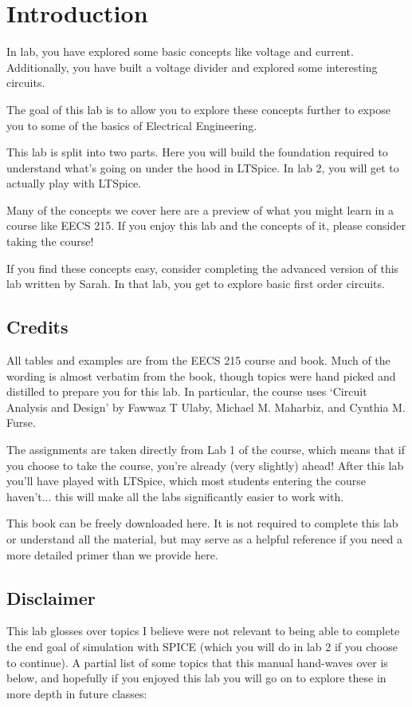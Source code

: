 \documentclass{article}
\begin{document}
\section{Introduction}
In lab, you have explored some basic concepts like voltage and current. Additionally, you have built a voltage divider and explored some interesting circuits.

The goal of this lab is to allow you to explore these concepts further to expose you to some of the basics of Electrical Engineering.

This lab is split into two parts. Here you will build the foundation required to understand what's going on under the hood in LTSpice. In lab 2, you will get to actually play with LTSpice.

Many of the concepts we cover here are a preview of what you might learn in a course like EECS 215. If you enjoy this lab and the concepts of it, please consider taking the course!

If you find these concepts easy, consider completing the advanced version of this lab written by Sarah. In that lab, you get to explore basic first order circuits.

\subsection{Credits}
All tables and examples are from the EECS 215 course and book. Much of the wording is almost verbatim from the book, though topics were hand picked and distilled to prepare you for this lab. In particular, the course uses `Circuit Analysis and Design' by Fawwaz T Ulaby, Michael M. Maharbiz, and Cynthia M. Furse.

The assignments are taken directly from Lab 1 of the course, which means that if you choose to take the course, you're already (very slightly) ahead! After this lab you'll have played with LTSpice, which most students entering the course haven't... this will make all the labs significantly easier to work with.

This book can be freely downloaded here. It is not required to complete this lab or understand all the material, but may serve as a helpful reference if you need a more detailed primer than we provide here.

\subsection{Disclaimer}
This lab glosses over topics I believe were not relevant to being able to complete the end goal of simulation with SPICE (which you will do in lab 2 if you choose to continue). A partial list of some topics that this manual hand-waves over is below, and hopefully if you enjoyed this lab you will go on to explore these in more depth in future classes:
\end{document}

